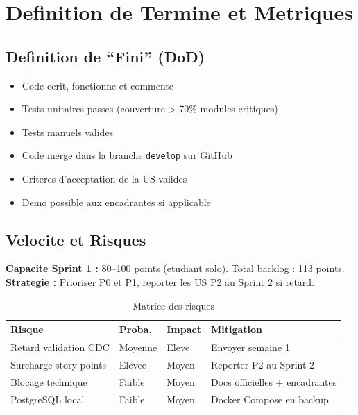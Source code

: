 ﻿\documentclass[12pt,a4paper]{report}
\begin{document}
\chapter{Definition de Termine et Metriques}

\section{Definition de ``Fini'' (DoD)}

\begin{itemize}
    \item[\checkmark] Code ecrit, fonctionne et commente
    \item[\checkmark] Tests unitaires passes (couverture > 70\% modules critiques)
    \item[\checkmark] Tests manuels valides
    \item[\checkmark] Code merge dans la branche \texttt{develop} sur GitHub
    \item[\checkmark] Criteres d'acceptation de la US valides
    \item[\checkmark] Demo possible aux encadrantes si applicable
\end{itemize}

\section{Velocite et Risques}

\textbf{Capacite Sprint 1 :} 80--100 points (etudiant solo). Total backlog : 113 points.\\
\textbf{Strategie :} Prioriser P0 et P1, reporter les US P2 au Sprint 2 si retard.

\begin{table}[H]
\centering
\begin{tabular}{|p{4cm}|p{2cm}|p{2cm}|p{5cm}|}
\hline
\rowcolor{bleu3S!20}
\textbf{Risque} & \textbf{Proba.} & \textbf{Impact} & \textbf{Mitigation} \\
\hline
Retard validation CDC & Moyenne & Eleve & Envoyer semaine 1 \\
\hline
Surcharge story points & Elevee & Moyen & Reporter P2 au Sprint 2 \\
\hline
Blocage technique & Faible & Moyen & Docs officielles + encadrantes \\
\hline
PostgreSQL local & Faible & Moyen & Docker Compose en backup \\
\hline
\end{tabular}
\caption{Matrice des risques}
\end{table}
\end{document}
